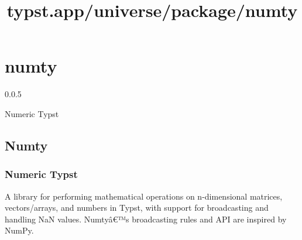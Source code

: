 \title{typst.app/universe/package/numty}

\label{banner}
\section{numty}\label{numty}

{ 0.0.5 }

Numeric Typst

\label{readme}
\subsection{Numty}\label{numty-1}

\subsubsection{Numeric Typst}\label{numeric-typst}

A library for performing mathematical operations on n-dimensional
matrices, vectors/arrays, and numbers in Typst, with support for
broadcasting and handling NaN values. Numtyâ€™s broadcasting rules and
API are inspired by NumPy.

